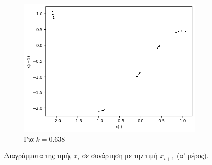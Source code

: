 \begin{figure}[ht]
\begin{subfigure}[b]{0.4\textwidth}
		\includegraphics[width=\textwidth]{LateX images/graphs q21/g8}
		\caption{Για $k=0.638$}
		\label{f:k108}
	\end{subfigure}
	\hfill		
	\caption{Διαγράμματα της τιμής \(x_i\) σε συνάρτηση με την τιμή \(x_{i+1}\) (α' μέρος).}
	\label{f:k244}
\end{figure}
